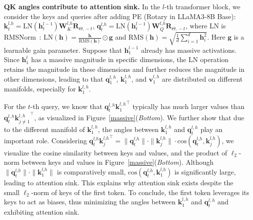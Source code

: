 \textbf{QK angles contribute to attention sink.}  In the $l$-th transformer block, we consider the keys and queries after adding PE (Rotary in LLaMA3-8B Base): $\boldsymbol{k}_t^{l\textrm{,}h}=\textrm{LN}(\boldsymbol{h}_t^{l-1})\boldsymbol{W}_{K}^{l\textrm{,}h}\boldsymbol{R}_{\Theta\textrm{,}\,-t}$, $\boldsymbol{q}_t^{l\textrm{,}h}=\textrm{LN}(\boldsymbol{h}_t^{l-1})\boldsymbol{W}_{Q}^{l\textrm{,}h}\boldsymbol{R}_{\Theta\textrm{,}\,-t}$, where LN is RMSNorm~\citep{zhang2019root}: $\textrm{LN}(\boldsymbol{h})=\frac{\boldsymbol{h}}{\textrm{RMS}(\boldsymbol{h})}\odot\boldsymbol{g}$ and $\textrm{RMS}(\boldsymbol{h})=\sqrt{\frac{1}{d}\sum_{i=1}^d\boldsymbol{h}_i^2}$.
Here $\boldsymbol{g}$ is a learnable gain parameter. Suppose that $\boldsymbol{h}_1^{l-1}$ already has massive activations. Since $\boldsymbol{h}_1^{l}$ has a massive magnitude in specific dimensions, the LN operation retains the magnitude in these dimensions and further reduces the magnitude in other dimensions, leading to that $\boldsymbol{q}_1^{l\textrm{,}\,h}$,  $\boldsymbol{k}_1^{l\textrm{,}\,h}$, and  $\boldsymbol{v}_1^{l\textrm{,}\,h}$ are distributed on different manifolds, especially for $\boldsymbol{k}_1^{l\textrm{,}\,h}$. 

For the $t$-th query, we know that $\boldsymbol{q}_t^{l\textrm{,}\,h}{\boldsymbol{k}_{1}^{l\textrm{,}\,h}}^\top$ typically has much larger values than $\boldsymbol{q}_t^{l\textrm{,}\,h}{\boldsymbol{k}_{j\neq 1}^{l\textrm{,}\,h}}^\top$, as visualized in Figure~\ref{massive}(\emph{Bottom}). We further show that due to the different manifold of $\boldsymbol{k}_1^{l\textrm{,}\,h}$, the angles between $\boldsymbol{k}_1^{l\textrm{,}\,h}$ and $\boldsymbol{q}_{t}^{l\textrm{,}\,h}$ play an important role. Considering $\boldsymbol{q}_t^{l\textrm{,}h}{\boldsymbol{k}_j^{l\textrm{,}h}}^\top=\|\boldsymbol{q}_t^{l\textrm{,}h}\|\cdot\|\boldsymbol{k}_j^{l\textrm{,}h}\|\cdot\textrm{cos}(\boldsymbol{q}_t^{l\textrm{,}h}\textrm{,}\,\boldsymbol{k}_j^{l\textrm{,}h})$, we visualize the cosine similarity between keys and values, and the product of $\ell_2$-norm between keys and values in Figure~\ref{massive}(\emph{Bottom}). Although $\|\boldsymbol{q}_t^{l\textrm{,}h}\|\cdot\|\boldsymbol{k}_1^{l\textrm{,}h}\|$ is comparatively small,  $\textrm{cos}(\boldsymbol{q}_t^{l\textrm{,}h}\textrm{,}\,\boldsymbol{k}_1^{l\textrm{,}h})$ is significantly large, leading to attention sink. This explains why attention sink exists despite the small $\ell_2$-norm of keys of the first token. To conclude,  the first token leverages its keys to act as biases, thus minimizing the angles between $\boldsymbol{k}_{1}^{l\textrm{,}\,h}$ and $\boldsymbol{q}_{t}^{l\textrm{,}\,h}$ and exhibiting attention sink.


